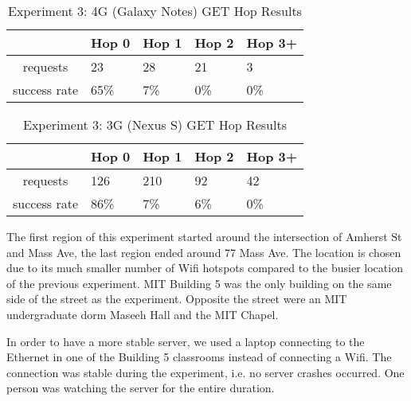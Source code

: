 
\begin{table}[htb]
\begin{scriptsize} 
\caption{Experiment 3: 4G (Galaxy Notes) GET Hop Results} 
\label{table:exp-3-4g-hop-results}
 \begin{center}
 \begin{tabular}{| c | p{1.5cm} | p{1.5cm} | p{1.5cm} | p{1.4cm} |}
  \hline
   & Hop 0 & Hop 1 & Hop 2 & Hop 3+ \\
  \hline
  requests & 23 & 28 & 21 & 3\\
  \hline
  success rate & 65\% & 7\% & 0\% & 0\% \\
  \hline
  \end{tabular}
  \end{center}
\end{scriptsize}
\end{table}

\begin{table}[htb]
\begin{scriptsize} 
\caption{Experiment 3: 3G (Nexus S) GET Hop Results} 
\label{table:exp-3-3g-hop-results}
 \begin{center}
 \begin{tabular}{| c | p{1.5cm} | p{1.5cm} | p{1.5cm} | p{1.4cm} |}
  \hline
   & Hop 0 & Hop 1 & Hop 2 & Hop 3+ \\
  \hline
  requests & 126 & 210 & 92 & 42\\
  \hline
  success rate & 86\% & 7\% & 6\% & 0\% \\
  \hline
  \end{tabular}
  \end{center}
\end{scriptsize}
\end{table}

The first region of this experiment started around the intersection of Amherst St and Mass Ave, the last region ended around 77 Mass Ave. The location is chosen due to its much smaller number of Wifi hotspots compared to the busier location of the previous experiment. MIT Building 5 was the only building on the same side of the street as the experiment. Opposite the street were an MIT undergraduate dorm Maseeh Hall and the MIT Chapel.

In order to have a more stable server, we used a laptop connecting to the Ethernet in one of the Building 5 classrooms instead of connecting a Wifi. The connection was stable during the experiment, i.e. no server crashes occurred. One person was watching the server for the entire duration. 

